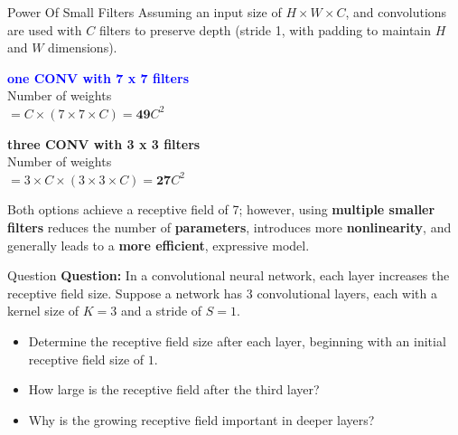 \documentclass[default, aspectratio=169]{beamer}
\begin{document}
	\begin{frame}{Power Of Small Filters}
		Assuming an input size of  $H \times W \times C$, and convolutions are used with $C$ filters to preserve depth (stride 1, with padding to maintain $H$ and $W$ dimensions).
		
		\bigskip
		\begin{minipage}{0.45\textwidth}
			\textcolor{blue}{\textbf{one CONV with 7 x 7 filters}} \\
			Number of weights \\
			$= C \times (7 \times 7 \times C) = \textbf{49} C^2$
		\end{minipage}
		\hfill
		\begin{minipage}{0.45\textwidth}
			\textbf{three CONV with 3 x 3 filters} \\
			Number of weights \\
			$= 3 \times C \times (3 \times 3 \times C) = \textbf{27} C^2$
		\end{minipage}
		\bigskip
		\begin{flushleft}
			Both options achieve a receptive field of 7; however, using \textbf{multiple smaller filters} reduces the number of \textbf{parameters}, introduces more \textbf{nonlinearity}, and generally leads to a \textbf{more efficient}, expressive model.
		\end{flushleft}
	\end{frame}	
	\begin{frame}{Question}
		\textbf{Question:} In a convolutional neural network, each layer increases the receptive field size. 
		Suppose a network has 3 convolutional layers, each with a kernel size of \( K = 3 \) and a stride of \( S = 1 \).
		\begin{itemize}
			\item Determine the receptive field size after each layer, beginning with an initial receptive field size of \( 1 \).
			\item How large is the receptive field after the third layer?
			\item Why is the growing receptive field important in deeper layers?
		\end{itemize}
	\end{frame}
	
\end{document}
